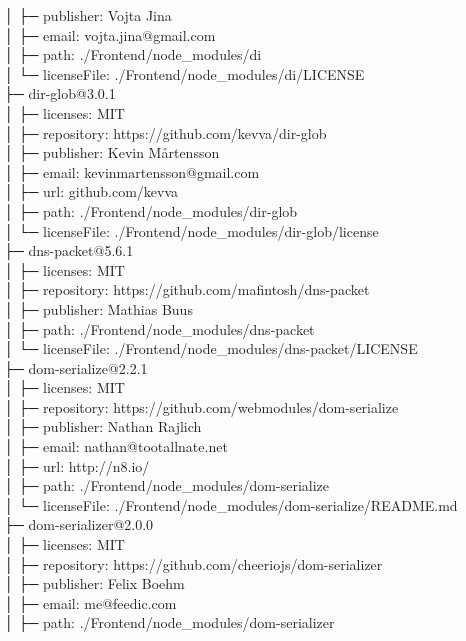 \documentclass[
    paper=a4,
    twoside=false,
    parskip=half,
    listof=entryprefix,
    listof=totoc,
    index=totoc,
    bibliography=totoc,
    headsepline,
]{scrbook}
\begin{document}
    │  ├─ publisher: Vojta Jina\\
    │  ├─ email: vojta.jina@gmail.com\\
    │  ├─ path: ./Frontend/node\_modules/di\\
    │  └─ licenseFile: ./Frontend/node\_modules/di/LICENSE\\
    ├─ dir-glob@3.0.1\\
    │  ├─ licenses: MIT\\
    │  ├─ repository: https://github.com/kevva/dir-glob\\
    │  ├─ publisher: Kevin Mårtensson\\
    │  ├─ email: kevinmartensson@gmail.com\\
    │  ├─ url: github.com/kevva\\
    │  ├─ path: ./Frontend/node\_modules/dir-glob\\
    │  └─ licenseFile: ./Frontend/node\_modules/dir-glob/license\\
    ├─ dns-packet@5.6.1\\
    │  ├─ licenses: MIT\\
    │  ├─ repository: https://github.com/mafintosh/dns-packet\\
    │  ├─ publisher: Mathias Buus\\
    │  ├─ path: ./Frontend/node\_modules/dns-packet\\
    │  └─ licenseFile: ./Frontend/node\_modules/dns-packet/LICENSE\\
    ├─ dom-serialize@2.2.1\\
    │  ├─ licenses: MIT\\
    │  ├─ repository: https://github.com/webmodules/dom-serialize\\
    │  ├─ publisher: Nathan Rajlich\\
    │  ├─ email: nathan@tootallnate.net\\
    │  ├─ url: http://n8.io/\\
    │  ├─ path: ./Frontend/node\_modules/dom-serialize\\
    │  └─ licenseFile: ./Frontend/node\_modules/dom-serialize/README.md\\
    ├─ dom-serializer@2.0.0\\
    │  ├─ licenses: MIT\\
    │  ├─ repository: https://github.com/cheeriojs/dom-serializer\\
    │  ├─ publisher: Felix Boehm\\
    │  ├─ email: me@feedic.com\\
    │  ├─ path: ./Frontend/node\_modules/dom-serializer\\
\end{document}
